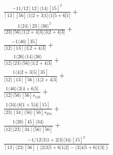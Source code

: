 \documentclass[varwidth, border=5pt]{standalone}
\begin{document}
\begin{my}
$\begin{gathered}
\scriptscriptstyle\frac{-11/12[12]⟨14⟩[15]^2}{[13][56]⟨1|2+3|1]⟨1|5+6|1]}+\\
\scriptscriptstyle\frac{1⟨24⟩[23]⟨36⟩^2}{⟨23⟩⟨56⟩⟨1|2+4|3]⟨3|2+4|3]}+\\
\scriptscriptstyle\frac{-1⟨46⟩[35]}{⟨12⟩[13]⟨1|2+4|3]}+\\
\scriptscriptstyle\frac{1⟨26⟩⟨14⟩⟨36⟩}{⟨12⟩⟨23⟩⟨56⟩⟨1|2+4|3]}+\\
\scriptscriptstyle\frac{1⟨4|2+3|5][35]}{⟨12⟩[13][56]⟨1|2+4|3]}+\\
\scriptscriptstyle\frac{1⟨46⟩⟨3|4+6|5]}{⟨12⟩⟨56⟩[56]s_{123}}+\\
\scriptscriptstyle\frac{1⟨34⟩⟨6|1+5|4][15]}{⟨23⟩[34]⟨56⟩[56]s_{234}}+\\
\scriptscriptstyle\frac{1⟨26⟩[45]⟨34⟩}{⟨12⟩⟨23⟩[34]⟨56⟩[56]}+\\
\scriptscriptstyle\frac{-1/12⟨3|1+2|3]⟨34⟩[15]^2}{[13]⟨23⟩[56](⟨2|3|5+6|1|2]-⟨3|4|5+6|1|3])}\phantom{+}
\end{gathered}$
\end{my}
\end{document}
